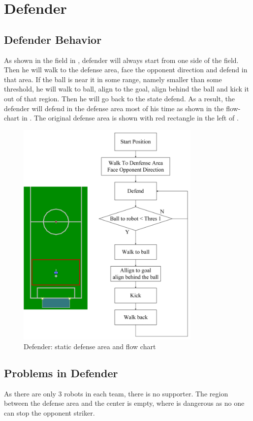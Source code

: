 \section{Defender}
\subsection{Defender Behavior}
As shown in the field in , defender will always start from one side of the field. Then he will walk to the defense area, face the opponent direction and defend in that area. If the ball is near it in some range, namely smaller than some threshold, he will walk to ball, align to the goal, align behind the ball and kick it out of that region. Then he will go back to the state defend. As a result, the defender will defend in the defense area most of his time as shown in the flow-chart in . The original defense area is shown with red rectangle in the left of .
\begin{figure}[!htb]
  \centering
  \includegraphics[width=0.8\textwidth]{pics/St_DA}
  \caption{Defender: static defense area and flow chart }
  \label{fig: DeFloCha}
\end{figure}

\subsection{Problems in Defender}
As there are only 3 robots in each team, there is no supporter. The region between the defense area and the center is empty, where is dangerous as no one can stop the opponent striker.

